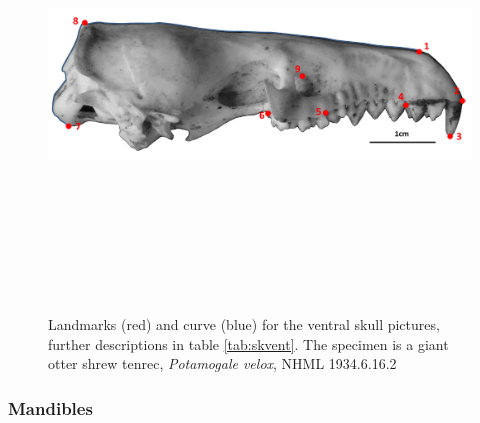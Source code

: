 \documentclass[12pt,a4paper]{article}
\begin{document}
	\begin{figure}[H] 
 	\centering
  	\includegraphics[width=12cm, height=12cm, keepaspectratio=true]
  	{figures/sklat_landmarks_pot_vel.png}
    \caption {Landmarks (red) and curve (blue) for the ventral skull pictures, further descriptions in table \ref{tab:skvent}. The specimen is a giant otter shrew tenrec, \textit{Potamogale velox}, NHML 1934.6.16.2}
  	\label{fig:sklat_landmarks}
  	\end{figure}


	\begin{table}[h]
	\caption{Descriptions of the landmarks (points) and curves (semilandmarks) for the skulls in lateral view (see Figure \ref{fig:sklat_landmarks}.} 
	
	\label{tab:sklat}
	\end{table}
\subsubsection{Mandibles}
\end{document}

